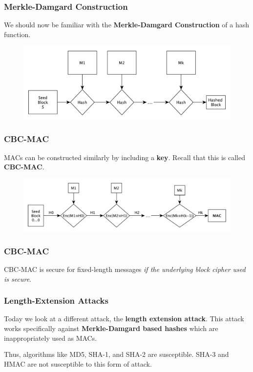 \documentclass{beamer}
\newcommand{\<}{\langle}
\renewcommand{\>}{\rangle}
\begin{document}
\begin{frame}
\frametitle{Merkle-Damgard Construction}

We should now be familiar with the \textbf{Merkle-Damgard Construction} of a hash function.

\begin{figure}
\centering
\includegraphics[scale=.5]{IMG/hash3}
\end{figure}
\end{frame}


\begin{frame}
\frametitle{CBC-MAC}

MACs can be constructed similarly by including a \textbf{key}. Recall that this is called \textbf{CBC-MAC}.

\begin{figure}
\centering
\includegraphics[scale=.45]{IMG/CBCMACchain}
\end{figure}
\end{frame}


\begin{frame}
\frametitle{CBC-MAC}

CBC-MAC is secure for fixed-length messages \emph{if the underlying block cipher used is secure}.
\end{frame}


\begin{frame}
\frametitle{Length-Extension Attacks}

Today we look at a different attack, the \textbf{length extension attack}. This attack works specifically against \textbf{Merkle-Damgard based hashes} which are inappropriately used as MACs.\newline

Thus, algorithms like MD5, SHA-1, and SHA-2 are susceptible. SHA-3 and HMAC are not susceptible to this form of attack. 
\end{frame}
\end{document}
